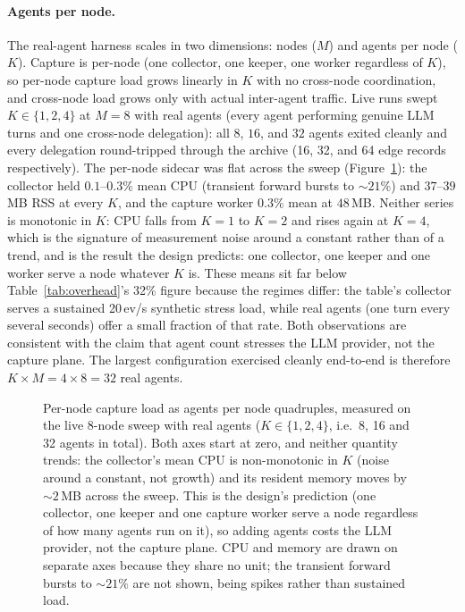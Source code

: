\paragraph{Agents per node.} The real-agent harness scales in two
dimensions: nodes ($M$) and agents per node ($K$). Capture is per-node
(one collector, one keeper, one worker regardless of $K$), so
per-node capture load grows linearly in $K$ with no cross-node
coordination, and cross-node load grows only with actual inter-agent
traffic. Live runs swept $K \in \{1, 2, 4\}$ at $M = 8$ with real agents
(every agent performing genuine LLM turns and one cross-node delegation):
all $8$, $16$, and $32$ agents exited cleanly and every delegation
round-tripped through the archive (16, 32, and 64 edge records
respectively). The per-node sidecar was flat across the sweep
(Figure~\ref{fig:agents-per-node}): the
collector held $0.1$--$0.3\%$ mean CPU (transient forward bursts to
${\sim}21\%$) and $37$--$39$\,MB RSS at every $K$, and the capture
worker $0.3\%$ mean at $48$\,MB. Neither series is monotonic in $K$: CPU
falls from $K{=}1$ to $K{=}2$ and rises again at $K{=}4$, which is
the signature of measurement noise around a constant rather than of a
trend, and is the result the design predicts: one collector, one keeper
and one worker serve a node whatever $K$ is. These means sit far below
Table~\ref{tab:overhead}'s 32\% figure because the regimes differ: the
table's collector serves a sustained 20\,ev/s synthetic stress load,
while real agents (one turn every several seconds) offer a small
fraction of that rate. Both observations are consistent with the claim
that agent count stresses the LLM provider, not the capture plane. The
largest configuration exercised cleanly end-to-end is therefore
$K {\times} M = 4 {\times} 8 = 32$ real agents.

\begin{figure}[h]
  \centering
  
  \caption[Per-node capture load vs.\ agents per node]{Per-node capture load
  as agents per node quadruples, measured on the live 8-node sweep with real
  agents ($K \in \{1,2,4\}$, i.e.\ 8, 16 and 32 agents in total). Both axes
  start at zero, and neither quantity trends: the collector's mean CPU is
  non-monotonic in $K$ (noise around a constant, not growth) and its
  resident memory moves by ${\sim}2$\,MB across the sweep. This is the
  design's prediction (one collector, one keeper and one capture worker
  serve a node regardless of how many agents run on it), so adding agents
  costs the LLM provider, not the capture plane. CPU and memory are drawn on
  separate axes because they share no unit; the transient forward bursts to
  ${\sim}21\%$ are not shown, being spikes rather than sustained load.}
  \label{fig:agents-per-node}
\end{figure}

